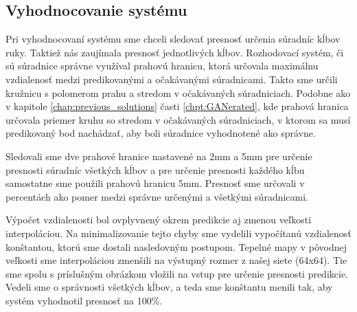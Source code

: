 \subsection{Vyhodnocovanie systému}
Pri vyhodnocovaní systému sme chceli sledovať presnosť určenia súradníc kĺbov ruky. Taktiež nás zaujímala presnosť jednotlivých kĺbov. Rozhodovací systém, či sú súradnice správne využíval prahovú hranicu, ktorá určovala maximálnu vzdialenosť medzi predikovanými a očakávanými súradnicami. Takto sme určili kružnicu s polomerom prahu a stredom v očakávaných súradniciach. Podobne ako v kapitole \ref{chap:previous_solutions} časti \ref{chpt:GANerated}, kde prahová hranica určovala priemer kruhu so stredom v očakávaných súradniciach, v ktorom sa musí predikovaný bod nachádzať, aby boli súradnice vyhodnotené ako správne. 

Sledovali sme dve prahové hranice nastavené na 2mm a 5mm pre určenie presnosti súradníc všetkých kĺbov a pre určenie presnosti každého kĺbu samostatne sme použili prahovú hranicu 5mm. Presnosť sme určovali v percentách ako pomer medzi správne určenými a všetkými súradnicami. 

Výpočet vzdialenosti bol ovplyvnený okrem predikcie aj zmenou veľkosti interpoláciou. Na minimalizovanie tejto chyby sme vydelili vypočítanú vzdialenosť konštantou, ktorú sme dostali nasledovným postupom. Tepelné mapy v pôvodnej veľkosti sme interpoláciou zmenšili na výstupný rozmer z našej siete (64x64). Tie sme spolu s príslušným obrázkom vložili na vstup pre určenie presnosti predikcie. Vedeli sme o správnosti všetkých kĺbov, a teda sme konštantu menili tak, aby systém vyhodnotil presnosť na 100\%.
